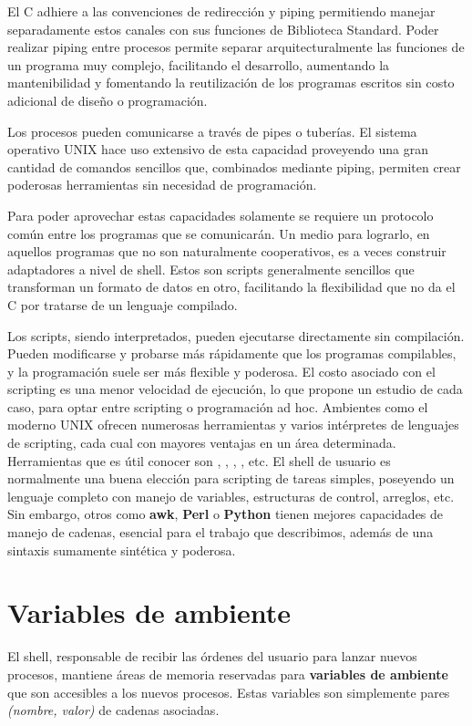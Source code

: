 El C adhiere a las convenciones de redirección y piping permitiendo manejar
separadamente estos canales con sus funciones de Biblioteca Standard. Poder
realizar piping entre procesos permite separar arquitecturalmente las funciones
de un programa muy complejo, facilitando el desarrollo, aumentando la
mantenibilidad y fomentando la reutilización de los programas escritos sin
costo adicional de diseño o programación.

 Los procesos pueden comunicarse a través de pipes o tuberías. El sistema
 operativo UNIX hace uso extensivo de esta capacidad proveyendo una gran
 cantidad de comandos sencillos que, combinados mediante piping, permiten crear
 poderosas herramientas sin necesidad de programación.

Para poder aprovechar estas capacidades solamente se requiere un protocolo
común entre los programas que se comunicarán. Un medio para lograrlo, en
aquellos programas que no son naturalmente cooperativos, es a veces construir
adaptadores a nivel de shell. Estos son scripts generalmente sencillos que
transforman un formato de datos en otro, facilitando la flexibilidad que no da
el C por tratarse de un lenguaje compilado.

Los scripts, siendo interpretados, pueden ejecutarse directamente sin
compilación. Pueden modificarse y probarse más rápidamente que los programas
compilables, y la programación suele ser más flexible y poderosa. El costo
asociado con el scripting es una menor velocidad de ejecución, lo que propone
un estudio de cada caso, para optar entre scripting o programación ad hoc.
Ambientes como el moderno UNIX ofrecen numerosas herramientas y varios
intérpretes de lenguajes de scripting, cada cual con mayores ventajas en un
área determinada. Herramientas que es útil conocer son , , , ,
etc. El shell de usuario es normalmente una buena elección para scripting de
tareas simples, poseyendo un lenguaje completo con manejo de variables,
estructuras de control, arreglos, etc. Sin embargo, otros como \textbf{awk}, \textbf{Perl} o
\textbf{Python} tienen mejores capacidades de manejo de cadenas, esencial para el
trabajo que describimos, además de una sintaxis sumamente sintética y poderosa.

\section{Variables de ambiente}
El shell, responsable de recibir las órdenes del usuario para lanzar nuevos
procesos, mantiene áreas de memoria reservadas para \textbf{variables de ambiente} que
son accesibles a los nuevos procesos. Estas variables son simplemente pares
\textit{(nombre, valor)} de cadenas asociadas. 

